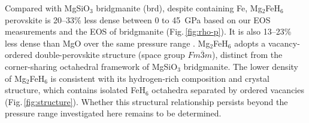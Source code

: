 \documentclass[draft,jgrga,12pt]{agujournal2019}
\begin{document}
Compared with MgSiO$_3$ bridgmanite (brd), despite containing Fe, Mg$_2$FeH$_6$ perovskite is 20--33\% less dense between 0 to 45~{GPa} based on our EOS measurements and the EOS of bridgmanite \cite{tange_pvt_2012} (Fig.\,\ref{fig:rho-p}). 
It is also 13--23\% less dense than MgO over the same pressure range \cite{dorogokupets_equations_2007}.
Mg$_2$FeH$_6$ adopts a vacancy-ordered double-perovskite structure (space group $Fm\overline{3}m$), distinct from the corner-sharing octahedral framework of MgSiO$_3$ bridgmanite.
The lower density of Mg$_2$FeH$_6$ is consistent with its hydrogen-rich composition and crystal structure, which contains isolated FeH$_6$ octahedra separated by ordered vacancies (Fig.\,\ref{fig:structure}). 
Whether this structural relationship persists beyond the pressure range investigated here remains to be determined.




\end{document}
